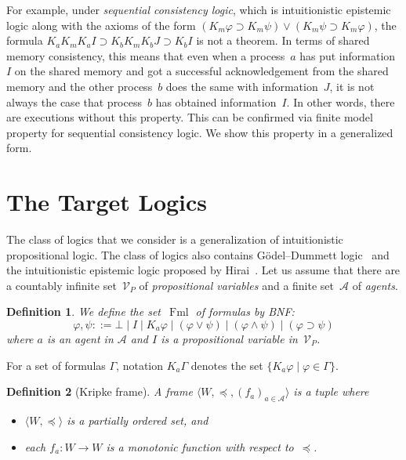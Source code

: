 \documentclass[doctor]{iscs-thesis}
\newcommand{\pvar}{\mathcal V_P}
\newcommand{\agents}{\mathcal A}
\newcommand{\tuple}[1]{\langle{#1}\rangle}
\newcommand{\fml}{\operatorname{Fml}}
\newtheorem{definition}{Definition}
\begin{document}
For example,
under \textit{sequential consistency logic}, which is intuitionistic epistemic
logic along with the axioms of the form
$(K_m\varphi\supset K_m\psi) \vee (K_m\psi\supset K_m\varphi)$,
the formula $K_aK_mK_aI \supset K_bK_mK_bJ\supset K_bI$ is not a
theorem.
In terms of shared memory consistency, this means that even when a
process~$a$ has put information~$I$ on the shared memory and got a
successful acknowledgement from the shared memory and the other
process~$b$ does the same with information~$J$, it is not always the
case that process~$b$ has obtained information~$I$\kern -2pt.
In other words, there are executions without this property.
This can be confirmed via
finite model property for sequential consistency logic.
We show this property in a generalized form.

\section{The Target Logics}
 \label{logic}

The class of logics that we consider is a generalization of
intuitionistic propositional logic.
The class of logics also contains G\"{o}del--Dummett logic~\cite{dummett59}
and the intuitionistic epistemic logic proposed by 
Hirai~\cite{hirailpar}.
Let us assume that
there are a countably infinite set~$\pvar$ of \textit{propositional variables} and a 
finite set~$\agents$ of \textit{agents}. 

\begin{definition}
We define the set~$\fml$ of formulas by BNF:
\[
 \varphi,\psi ::= \bot\mid I\mid K_a\varphi\mid (\varphi\vee\psi)\mid
 (\varphi\wedge\psi)\mid (\varphi\supset\psi)
\]
 where $a$ is an agent in $\agents$
 and $I$ is a propositional variable in~$\pvar$.
\end{definition}

For a set of formulas $\Gamma\!$, notation $K_a\Gamma$ denotes the set
$\{K_a\varphi\mid\varphi\in\Gamma\}$\enspace.

\begin{definition}[Kripke frame]
A \textit{frame} $\tuple{W,\preceq,(f_a)_{a\in \agents}}$ is a tuple where
\begin{itemize}
 \item $\tuple{W,\preceq}$ is a partially ordered set, and
 \item each $f_a\colon W\rightarrow W$ is a monotonic function with
       respect to~$\preceq$.
\end{itemize} 
\end{definition}
\end{document}
